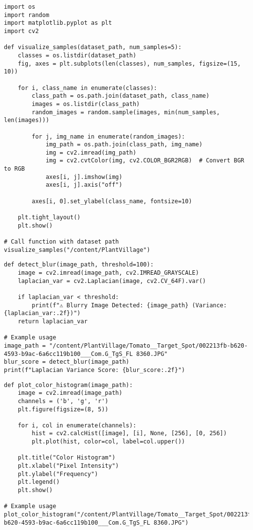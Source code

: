 \documentclass{article}
\begin{document}
\begin{lstlisting}
import os
import random
import matplotlib.pyplot as plt
import cv2

def visualize_samples(dataset_path, num_samples=5):
    classes = os.listdir(dataset_path)
    fig, axes = plt.subplots(len(classes), num_samples, figsize=(15, 10))

    for i, class_name in enumerate(classes):
        class_path = os.path.join(dataset_path, class_name)
        images = os.listdir(class_path)
        random_images = random.sample(images, min(num_samples, len(images)))

        for j, img_name in enumerate(random_images):
            img_path = os.path.join(class_path, img_name)
            img = cv2.imread(img_path)
            img = cv2.cvtColor(img, cv2.COLOR_BGR2RGB)  # Convert BGR to RGB
            axes[i, j].imshow(img)
            axes[i, j].axis("off")

        axes[i, 0].set_ylabel(class_name, fontsize=10)

    plt.tight_layout()
    plt.show()

# Call function with dataset path
visualize_samples("/content/PlantVillage")
\end{lstlisting}
\begin{lstlisting}
def detect_blur(image_path, threshold=100):
    image = cv2.imread(image_path, cv2.IMREAD_GRAYSCALE)
    laplacian_var = cv2.Laplacian(image, cv2.CV_64F).var()

    if laplacian_var < threshold:
        print(f"⚠ Blurry Image Detected: {image_path} (Variance: {laplacian_var:.2f})")
    return laplacian_var

# Example usage
image_path = "/content/PlantVillage/Tomato__Target_Spot/002213fb-b620-4593-b9ac-6a6cc119b100___Com.G_TgS_FL 8360.JPG"
blur_score = detect_blur(image_path)
print(f"Laplacian Variance Score: {blur_score:.2f}")
\end{lstlisting}
\begin{lstlisting}
def plot_color_histogram(image_path):
    image = cv2.imread(image_path)
    channels = ('b', 'g', 'r')
    plt.figure(figsize=(8, 5))

    for i, col in enumerate(channels):
        hist = cv2.calcHist([image], [i], None, [256], [0, 256])
        plt.plot(hist, color=col, label=col.upper())

    plt.title("Color Histogram")
    plt.xlabel("Pixel Intensity")
    plt.ylabel("Frequency")
    plt.legend()
    plt.show()

# Example usage
plot_color_histogram("/content/PlantVillage/Tomato__Target_Spot/002213fb-b620-4593-b9ac-6a6cc119b100___Com.G_TgS_FL 8360.JPG")
\end{lstlisting}
\end{document}
